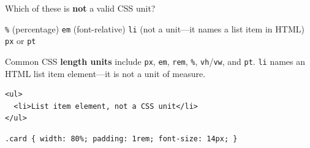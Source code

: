 \question[4]
Which of these is \textbf{not} a valid CSS unit?
\begin{choices}
  \choice \texttt{\%} (percentage)
  \choice \texttt{em} (font-relative)
  \CorrectChoice \texttt{li} (not a unit---it names a list item in HTML)
  \choice \texttt{px} or \texttt{pt}
\end{choices}
\begin{solution}
  Common CSS \textbf{length units} include \texttt{px}, \texttt{em}, \texttt{rem}, \texttt{\%}, \texttt{vh}/\texttt{vw}, and \texttt{pt}. \texttt{li} names an HTML list item element---it is not a unit of measure.
\begin{lstlisting}[style=htmlinline]
<ul>
  <li>List item element, not a CSS unit</li>
</ul>
\end{lstlisting}
\begin{lstlisting}[style=cssinline]
.card { width: 80%; padding: 1rem; font-size: 14px; }
\end{lstlisting}
\end{solution}

